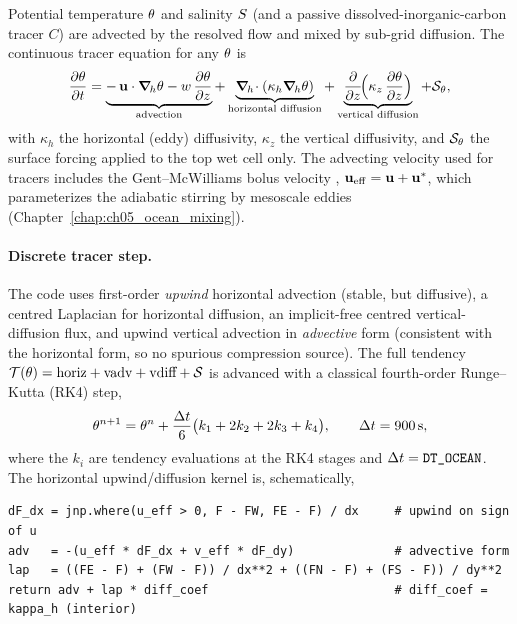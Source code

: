 Potential temperature $\theta$ and salinity $S$ (and a passive
dissolved-inorganic-carbon tracer $C$) are advected by the resolved flow
and mixed by sub-grid diffusion. The continuous tracer equation for any
$\theta$ is
\begin{equation}
  \frac{\partial \theta}{\partial t}
   = \underbrace{-\,\mathbf{u}\cdot\boldsymbol{\nabla}_{\!h}\theta - w\,\frac{\partial \theta}{\partial z}}_{\text{advection}}
   + \underbrace{\boldsymbol{\nabla}_{\!h}\!\cdot(\kappa_h\boldsymbol{\nabla}_{\!h}\theta)}_{\text{horizontal diffusion}}
   + \underbrace{\frac{\partial }{\partial z}\!\Big(\kappa_z\,\frac{\partial \theta}{\partial z}\Big)}_{\text{vertical diffusion}}
   + \mathcal{S}_\theta , \label{eq:tracer}
\end{equation}
with $\kappa_h$ the horizontal (eddy) diffusivity, $\kappa_z$ the vertical
diffusivity, and $\mathcal{S}_\theta$ the surface forcing applied to the top
wet cell only. The advecting velocity used for tracers includes the
Gent--McWilliams bolus velocity \citep{gentmcwilliams1990},
$\mathbf{u}_{\mathrm{eff}}=\mathbf{u}+\mathbf{u}^{*}$, which parameterizes the
adiabatic stirring by mesoscale eddies (Chapter~\ref{chap:ch05_ocean_mixing}).

\paragraph{Discrete tracer step.}
The code uses first-order \emph{upwind} horizontal advection (stable, but
diffusive), a centred Laplacian for horizontal diffusion, an implicit-free
centred vertical-diffusion flux, and upwind vertical advection in
\emph{advective} form (consistent with the horizontal form, so no spurious
compression source). The full tendency
$\mathcal{T}(\theta)=\text{horiz}+\text{vadv}+\text{vdiff}+\mathcal{S}$ is
advanced with a classical fourth-order Runge--Kutta (RK4) step,
\begin{equation}
  \theta^{n+1} = \theta^{n}
     + \frac{\Delta t}{6}\big(k_1+2k_2+2k_3+k_4\big),
  \qquad \Delta t = 900\,\mathrm{s},
  \label{eq:rk4}
\end{equation}
where the $k_i$ are tendency evaluations at the RK4 stages and
$\Delta t=\texttt{DT\_OCEAN}$.
The horizontal upwind/diffusion kernel is, schematically,
\begin{lstlisting}[caption={Upwind advection + Laplacian diffusion (one tracer face direction).}]
dF_dx = jnp.where(u_eff > 0, F - FW, FE - F) / dx     # upwind on sign of u
adv   = -(u_eff * dF_dx + v_eff * dF_dy)              # advective form
lap   = ((FE - F) + (FW - F)) / dx**2 + ((FN - F) + (FS - F)) / dy**2
return adv + lap * diff_coef                          # diff_coef = kappa_h (interior)
\end{lstlisting}

